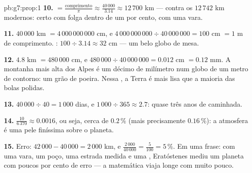 \begin{solution}{pb:g7:prop:1}
\textbf{10.}  $= \frac{\text{comprimento}}{\pi}
\approx \frac{40\,000}{3.14} \approx 12\,700$ km --- contra os
$12\,742$ km modernos: certo com folga dentro de um por cento, com uma
vara.

\textbf{11.} $40\,000$ km $= 4\,000\,000\,000$ cm, e
$4\,000\,000\,000 \div 40\,000\,000 = 100$ cm $= 1$ m de comprimento.
: $100 \div 3.14 \approx 32$ cm --- um belo globo de mesa.

\textbf{12.} $4.8$ km $= 480\,000$ cm, e
$480\,000 \div 40\,000\,000 = 0.012$ cm $= 0.12$ mm. A montanha mais
alta dos Alpes é um décimo de milímetro num globo de um metro de
contorno: um grão de poeira. Nessa , a Terra é mais lisa que a
maioria das bolas polidas.

\textbf{13.} $40\,000 \div 40 = 1\,000$ dias, e
$1\,000 \div 365 \approx 2.7$: quase três anos de caminhada.

\textbf{14.} $\frac{10}{6\,370} \approx 0.0016$, ou seja, cerca de
$0.2\,\%$ (mais precisamente $0.16\,\%$): a atmosfera é uma pele
finíssima sobre o planeta.

\textbf{15.} Erro: $42\,000 - 40\,000 = 2\,000$ km, e
$\frac{2\,000}{40\,000} = \frac{5}{100} = 5\,\%$. Em uma frase: com uma
vara, um poço, uma estrada medida e uma , Eratóstenes
mediu um planeta com poucos por cento de erro --- a matemática viaja
longe com muito pouco.
\end{solution}
